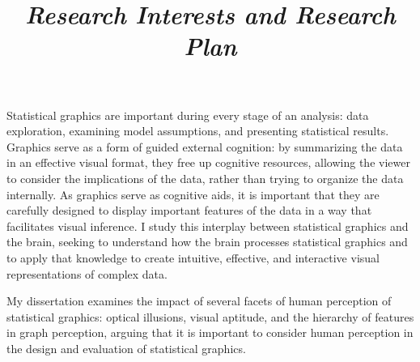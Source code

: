 \documentclass[12pt, letterpaper, sans]{moderncv}
\title{\emph{Research Interests and Research Plan}}
\begin{document}
\makecvtitle
\setlength{\parindent}{15pt} %

Statistical graphics are important during every stage of an analysis: data exploration, examining model assumptions, and presenting statistical results. Graphics serve as a form of guided external cognition: by summarizing the data in an effective visual format, they free up cognitive resources, allowing the viewer to consider the implications of the data, rather than trying to organize the data internally. As graphics serve as cognitive aids, it is important that they are carefully designed to display important features of the data in a way that facilitates visual inference. I study this interplay between statistical graphics and the brain, seeking to understand how the brain processes statistical graphics and to apply that knowledge to create intuitive, effective, and interactive visual representations of complex data.




\vspace{.5cm}\hspace{8pt} My dissertation examines the impact of several facets of human perception of statistical graphics: optical illusions, visual aptitude, and the hierarchy of features in graph perception, arguing that it is important to consider human perception in the design and evaluation of statistical graphics.
\end{document}
